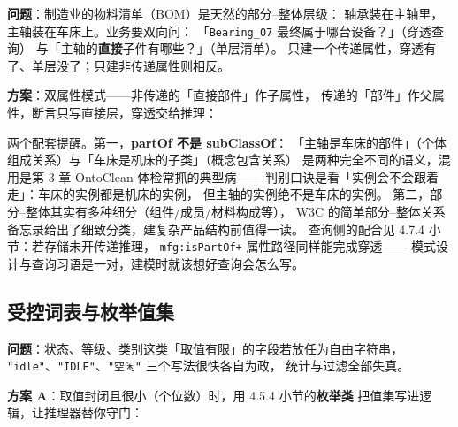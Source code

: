 \textbf{问题}：制造业的物料清单（BOM）是天然的部分--整体层级：
轴承装在主轴里，主轴装在车床上。业务要双向问：
「\texttt{Bearing\_07} 最终属于哪台设备？」（穿透查询）
与「主轴的\textbf{直接}子件有哪些？」（单层清单）。
只建一个传递属性，穿透有了、单层没了；只建非传递属性则相反。

\textbf{方案}：双属性模式——非传递的「直接部件」作子属性，
传递的「部件」作父属性，断言只写直接层，穿透交给推理：

\begin{codebox}
\codeline{\textcolor{cmtgray}{\#\ 双属性模式：直接部件（不传递）\ \(\sqsubseteq\)\ 部件（传递）}}
\codeblank{}
\codeline{\textcolor{cmtgray}{\#\ 数据只维护直接层级}}
\codeline{\textcolor{cmtgray}{\#\ 推理自动补出：mfg:Bearing\_07\ mfg:isPartOf\ mfg:Lathe\_001}}
\end{codebox}

两个配套提醒。第一，\textbf{partOf 不是 subClassOf}：
「主轴是车床的部件」（个体组成关系）与「车床是机床的子类」（概念包含关系）
是两种完全不同的语义，混用是第 3 章 OntoClean 体检常抓的典型病——
判别口诀是看「实例会不会跟着走」：车床的实例都是机床的实例，
但主轴的实例绝不是车床的实例。
第二，部分--整体其实有多种细分（组件/成员/材料构成等），
W3C 的简单部分--整体关系备忘录给出了细致分类，建复杂产品结构前值得一读。
查询侧的配合见 4.7.4 小节：若存储未开传递推理，
\texttt{mfg:isPartOf+} 属性路径同样能完成穿透——
模式设计与查询习语是一对，建模时就该想好查询会怎么写。

\subsection{受控词表与枚举值集}

\textbf{问题}：状态、等级、类别这类「取值有限」的字段若放任为自由字符串，
\texttt{"idle"}、\texttt{"IDLE"}、\texttt{"空闲"} 三个写法很快各自为政，
统计与过滤全部失真。

\textbf{方案 A}：取值封闭且很小（个位数）时，用 4.5.4 小节的\textbf{枚举类}
把值集写进逻辑，让推理器替你守门：

\begin{codebox}
\codeline{\textcolor{cmtgray}{\#\ 枚举值集：状态类的外延被\ owl:oneOf\ 封死为四个个体}}
\codeblank{}
\codeline{\textcolor{cmtgray}{\#\ 别忘了\ owl:AllDifferent\ 声明四个个体两两互异（无\ UNA！）}}
\end{codebox}

